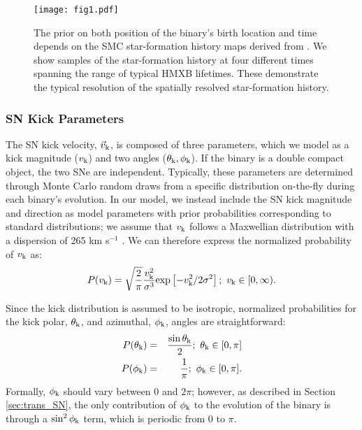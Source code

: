 \documentclass[usenatbib]{mnras}
\begin{document}
\begin{figure*}
\begin{center}
\texttt{[image: fig1.pdf]}
\caption{The prior on both position of the binary's birth location and time depends on the SMC star-formation history maps derived from \citet{harris04}. We show samples of the star-formation history at four different times spanning the range of typical HMXB lifetimes. These demonstrate the typical resolution of the spatially resolved star-formation history.}
\label{fig:SMC_SFH}
\end{center}
\end{figure*}


\subsubsection{SN Kick Parameters}

The SN kick velocity, $\vec{v}_{\rm k}$, is composed of three parameters, which we model as a kick magnitude ($v_{\rm k}$) and two angles ($\theta_{\rm k}, \phi_{\rm k}$). If the binary is a double compact object, the two SNe are independent. Typically, these parameters are determined through Monte Carlo random draws from a specific distribution on-the-fly during each binary's evolution. In our model, we instead include the SN kick magnitude and direction as model parameters with prior probabilities corresponding to standard distributions; we assume that $v_{\rm k}$ follows a Maxwellian distribution with a dispersion of 265 km s$^{-1}$ \citep{hobbs05}. We can therefore express the normalized probability of $v_{\rm k}$ as:
\begin{equation}
P(v_{\rm k}) = \sqrt{\frac{2}{\pi}} \frac{v_{\rm k}^2} {\sigma^3} {\rm exp} \left[ -v_{\rm k}^2 / 2 \sigma^2 \right];\ v_{\rm k} \in [0, \infty). \label{eq:P_v_k}
\end{equation}


Since the kick distribution is assumed to be isotropic, normalized probabilities for the kick polar, $\theta_{\rm k}$, and azimuthal, $\phi_{\rm k}$, angles are straightforward:
\begin{eqnarray}
P(\theta_{\rm k}) &=& \frac{\sin \theta_{\rm k}}{2};\ \theta_{\rm k} \in [0, \pi] \label{eq:P_theta_k} \\
P(\phi_{\rm k}) &=& \frac{1}{\pi};\ \phi_{\rm k} \in [0, \pi] . \label{eq:P_phi_k}
\end{eqnarray}
Formally, $\phi_{\rm k}$ should vary between 0 and $2 \pi$; however, as described in Section \ref{sec:trans_SN}, the only contribution of $\phi_{\rm k}$ to the evolution of the binary is through a $\sin^2 \phi_{\rm k}$ term, which is periodic from 0 to $\pi$.
\end{document}
